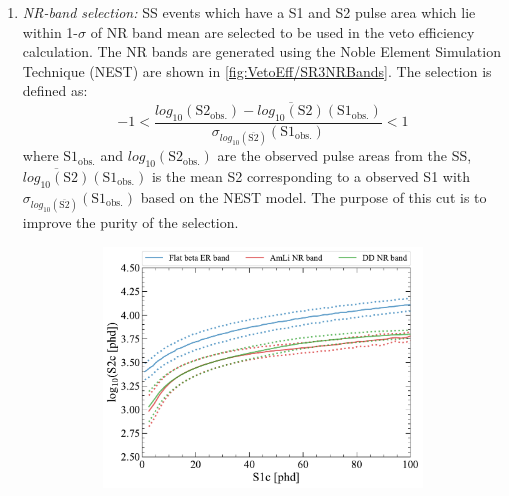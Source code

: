 \begin{enumerate}
	\item \textit{NR-band selection:} SS events which have a S1 and S2 pulse area which lie within 1-$\sigma$ of NR band mean are selected to be used in the veto efficiency calculation.
    The NR bands are generated using the Noble Element Simulation Technique (NEST) \cite{NEST2011} are shown in \autoref{fig:VetoEff/SR3NRBands}. 
    The selection is defined as:
    \begin{equation}\label{eqn:VetoEff/NRBandSelection}
        -1<\frac{log_{10}(\text{S2}_\text{obs.})-\overline{log_{10}(\text{S2})}(\text{S1}_\text{obs.})}{\sigma_{log_{10}(\overline{\text{S2}})}(\text{S1}_\text{obs.})}<1
    \end{equation}
    where $\text{S1}_\text{obs.}$ and $log_{10}(\text{S2}_\text{obs.})$ are the observed pulse areas from the SS, $\overline{log_{10}(\text{S2})}(\text{S1}_\text{obs.})$ is the mean S2 corresponding to a observed S1 with $\sigma_{log_{10}(\overline{\text{S2}})}(\text{S1}_\text{obs.})$ based on the NEST model. The purpose of this cut is to improve the purity of the selection. 
    \begin{figure}[!ht]
    \centering
    \begin{subfigure}[b]{0.49\textwidth}
        \centering
        \includegraphics[width=\textwidth]{figures/VetoEfficiency/NRBands.pdf}
        \caption{}
        \label{fig:VetoEff/SR3NRBands}
    \end{subfigure}
    \hfill
    \begin{subfigure}[b]{0.49\textwidth}
        \centering

\end{subfigure}
\end{figure}
\end{enumerate}
